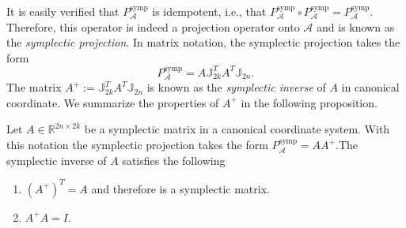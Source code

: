 It is easily verified that $P^{\text{symp}}_{\mathcal A}$ is idempotent, i.e., that $P^{\text{symp}}_{\mathcal A}\circ P^{\text{symp}}_{\mathcal A} = P^{\text{symp}}_{\mathcal A}$. Therefore, this operator is indeed a projection operator onto $\mathcal A$ and is known as the \emph{symplectic projection}. In matrix notation, the symplectic projection takes the form
\begin{equation} \label{p1.eq:SyMo:1.5}
	P^{\text{symp}}_{\mathcal A} = A \mathbb J_{2k}^T A^T \mathbb J_{2n}.
\end{equation}
The matrix $A^+ := \mathbb J_{2k}^T A^T \mathbb J_{2n}$ is known as the \emph{symplectic inverse} of $A$ in canonical coordinate. We summarize the properties of $A^+$ in the following proposition.
\begin{proposition} \label{p1.theorem:1}
\cite{doi:10.1137/140978922} Let $A\in \mathbb R^{2n\times 2k}$ be a symplectic matrix in a canonical coordinate system. With this notation the symplectic projection takes the form $P^{\text{symp}}_{\mathcal A} = AA^+$.The symplectic inverse of $A$ satisfies the following
\begin{enumerate} [label=(\alph*)]
\item $(A^+)^T = A$ and therefore is a symplectic matrix.
\item $A^+A = I$.
\end{enumerate}
\end{proposition}

